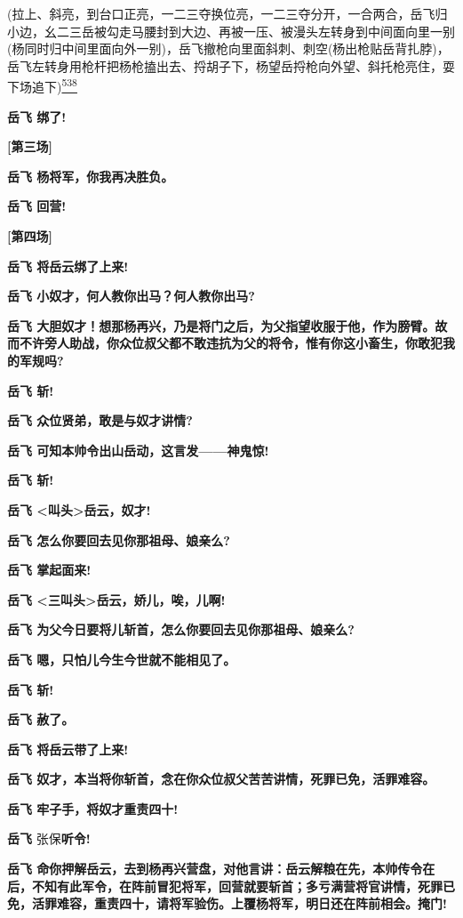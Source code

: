 (拉上、斜亮，到台口正亮，一二三夺换位亮，一二三夺分开，一合两合，岳飞归小边，幺二三岳被勾走马腰封到大边、再被一压、被漫头左转身到中间面向里一别(杨同时归中间里面向外一别)，岳飞撤枪向里面斜刺、刺空(杨出枪贴岳背扎脖)，岳飞左转身用枪杆把杨枪搕出去、捋胡子下，杨望岳捋枪向外望、斜托枪亮住，耍下场追下)\protect\hyperlink{fn538}{\textsuperscript{538}}

\textbf{岳飞 绑了!}

\textbf{{[}第三场{]}}

\textbf{岳飞 杨将军，你我再决胜负。}

\textbf{岳飞 回营!}

\textbf{{[}第四场{]}}

\textbf{岳飞 将岳云绑了上来!}

\textbf{岳飞 小奴才，何人教你出马？何人教你出马?}

\textbf{岳飞
大胆奴才！想那杨再兴，乃是将门之后，为父指望收服于他，作为膀臂。故而不许旁人助战，你众位叔父都不敢违抗为父的将令，惟有你这小畜生，你敢犯我的军规吗?}

\textbf{岳飞 斩!}

\textbf{岳飞 众位贤弟，敢是与奴才讲情?}

\textbf{岳飞 可知本帅令出山岳动，这言发------神鬼惊!}

\textbf{岳飞 斩!}

\textbf{岳飞 \textless{}叫头\textgreater{}岳云，奴才!}

\textbf{岳飞 怎么你要回去见你那祖母、娘亲么?}

\textbf{岳飞 掌起面来!}

\textbf{岳飞 \textless{}三叫头\textgreater{}岳云，娇儿，唉，儿啊!}

\textbf{岳飞 为父今日要将儿斩首，怎么你要回去见你那祖母、娘亲么?}

\textbf{岳飞 嗯，只怕儿今生今世就不能相见了。}

\textbf{岳飞 斩!}

\textbf{岳飞 赦了。}

\textbf{岳飞 将岳云带了上来!}

\textbf{岳飞
奴才，本当将你斩首，念在你众位叔父苦苦讲情，死罪已免，活罪难容。}

\textbf{岳飞 牢子手，将奴才重责四十!}

\textbf{岳飞} 张保\textbf{听令!}

\textbf{岳飞
命你押解岳云，去到杨再兴营盘，对他言讲：岳云解粮在先，本帅传令在后，不知有此军令，在阵前冒犯将军，回营就要斩首；多亏满营将官讲情，死罪已免，活罪难容，重责四十，请将军验伤。上覆杨将军，明日还在阵前相会。掩门!}

